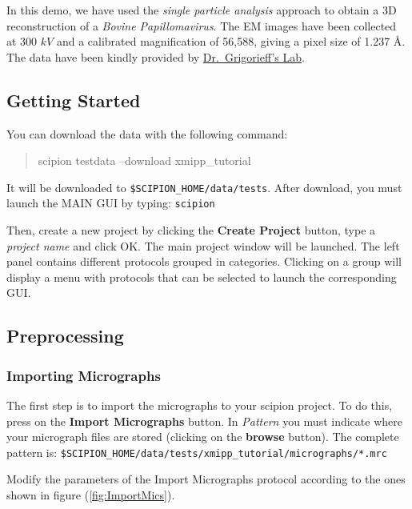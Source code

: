 \documentclass[12pt]{article} %
\newenvironment{command}{\tt\begin{quote}}{\end{quote}}
\newcommand{\comm}[1]{\texttt{#1}}
\begin{document}
In this demo, we have used the \emph{single particle analysis} approach to obtain
a 3D reconstruction of a \emph{Bovine Papillomavirus}. The EM images have been
collected at 300 $kV$ and a calibrated magnification of 56,588,  %
giving a pixel
size of 1.237 \AA  \citep{Wolf2010}. The data have been kindly
provided by \href{http://grigoriefflab.janelia.org/}{Dr.~Grigorieff’s Lab}.

\subsection{Getting Started}

You can download the data with the following command:

\begin{command}
scipion testdata --download xmipp\_tutorial
\end{command}

It will be downloaded to \verb+$SCIPION_HOME/data/tests+. After download, you must
launch the MAIN GUI by typing: \comm{scipion}


Then, create a new project by clicking the \textbf{Create Project} button, type a
\textit{project name} and click OK. The main project window will be launched.
The left panel contains different protocols grouped in categories. Clicking on
a group will display a menu with protocols that can be selected to launch the
corresponding GUI.

\subsection{Preprocessing}

\subsubsection{Importing Micrographs}

The first step is to import the micrographs to your scipion project. To do this,
press on the \textbf{Import Micrographs} button. In \textit{Pattern}  you must indicate
where your micrograph files are stored (clicking on the \textbf{browse} button). The
complete pattern is: \verb+$SCIPION_HOME/data/tests/xmipp_tutorial/micrographs/*.mrc+

Modify the parameters of the Import Micrographs protocol according to the ones
shown in figure (\ref{fig:ImportMics}).
\end{document}
